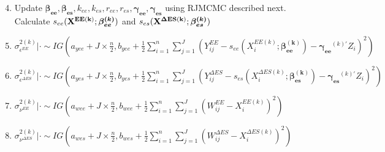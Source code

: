 \documentclass[handout]{beamer}\usepackage[]{graphicx}\usepackage[]{color}
\begin{document}
\begin{frame}

\begin{enumerate}
\setcounter{enumi}{3}
\item
Update ${\boldsymbol{\beta_{ee}},\boldsymbol{\beta_{es}}},k_{ee},k_{es}, {  r_{ee}, r_{es}}, \boldsymbol{\gamma_{ee}^{}}, \boldsymbol{\gamma_{es}^{}}$ using RJMCMC described next. Calculate $s_{ee}({\bf X^{EE(k)}};\boldsymbol{\beta_{ee}^{(k)}})$ and $s_{es}({\bf X^{\Delta ES(k)}};\boldsymbol{\beta_{es}^{(k)}})$ \\

\vspace{0.2cm}

\item
 $\sigma^{2(k)}_{\epsilon^{EE}} |\cdot \sim IG(a_{yee}+J\times \frac{n}{2},b_{yee}+\frac{1}{2}\sum_{i=1}^{n}\sum_{j=1}^{J}(Y_{ij}^{EE}-s_{ee}(X_i^{EE(k)};\boldsymbol{\beta_{ee}^{(k)}})-\boldsymbol{\gamma_{ee}}^{(k)'}Z_i)^2)$ \\
 
\vspace{0.2cm}

\item
 $\sigma^{2(k)}_{\epsilon^{\Delta ES}} |\cdot \sim IG(a_{yes}+J\times \frac{n}{2},b_{yes}+\frac{1}{2}\sum_{i=1}^{n}\sum_{j=1}^{J}(Y_{ij}^{\Delta ES}-s_{es}(X_i^{\Delta ES(k)};\boldsymbol{\beta_{es}^{(k)}})-\boldsymbol{\gamma_{es}}^{(k)'}Z_i)^2)$ \\
 
 \vspace{0.2cm}
 
\item
 $\sigma^{2(k)}_{\nu^{EE}} |\cdot \sim IG(a_{wee}+J\times \frac{n}{2},b_{wee}+\frac{1}{2}\sum_{i=1}^{n}\sum_{j=1}^{J}(W_{ij}^{EE}-X_i^{EE(k)})^2)$ \\
 
 \vspace{0.2cm}
 
\item
 $\sigma^{2(k)}_{\nu^{\Delta ES}} |\cdot \sim IG(a_{wes}+J\times \frac{n}{2},b_{wes}+\frac{1}{2}\sum_{i=1}^{n}\sum_{j=1}^{J}(W_{ij}^{\Delta ES}-X_i^{\Delta ES(k)})^2)$ \\
 
 \end{enumerate}


\end{frame}
\end{document}
